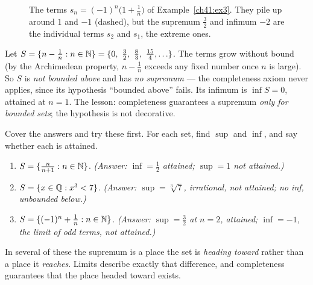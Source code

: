 \begin{figure}[H]
\centering
{}
\caption{The terms $s_n=(-1)^n\bigl(1+\tfrac1n\bigr)$ of Example~\ref{ch41:ex3}. They pile up
around $1$ and $-1$ (dashed), but the supremum $\tfrac32$ and infimum $-2$ are the
individual terms $s_2$ and $s_1$, the extreme ones.}
\label{ch41:fig-ex3}
\end{figure}

\begin{example}
\label{ch41:ex4}
Let $S = \set{n - \tfrac1n : n\in\N} = \set{0,\ \tfrac32,\ \tfrac83,\ \tfrac{15}{4},\ldots}$.
The terms grow without bound (by the Archimedean property, $n-\frac1n$ exceeds any fixed
number once $n$ is large). So $S$ is \emph{not bounded above} and has \emph{no supremum} ---
the completeness axiom never applies, since its hypothesis ``bounded above'' fails. Its
infimum is $\inf S=0$, attained at $n=1$. The lesson: completeness guarantees a supremum
\emph{only for bounded sets}; the hypothesis is not decorative.
\end{example}

\begin{labbox}
Cover the answers and try these first. For each set, find $\sup$ and $\inf$,
and say whether each is attained.
\begin{enumerate}
  \item $S = \{\tfrac{n}{n+1} : n\in\mathbb{N}\}$. \quad
        \emph{(Answer: $\inf=\tfrac12$ attained; $\sup=1$ not attained.)}
  \item $S = \{x\in\mathbb{Q} : x^3 < 7\}$. \quad
        \emph{(Answer: $\sup=\sqrt[3]{7}$, irrational, not attained; no inf, unbounded below.)}
  \item $S = \{(-1)^n + \tfrac1n : n\in\mathbb{N}\}$. \quad
        \emph{(Answer: $\sup=\tfrac32$ at $n=2$, attained; $\inf=-1$, the limit of odd
        terms, \emph{not} attained.)}
\end{enumerate}
In several of these the supremum is a place the set is \emph{heading toward} rather than a
place it \emph{reaches}. Limits describe exactly that difference, and completeness guarantees
that the place headed toward exists.
\end{labbox}

